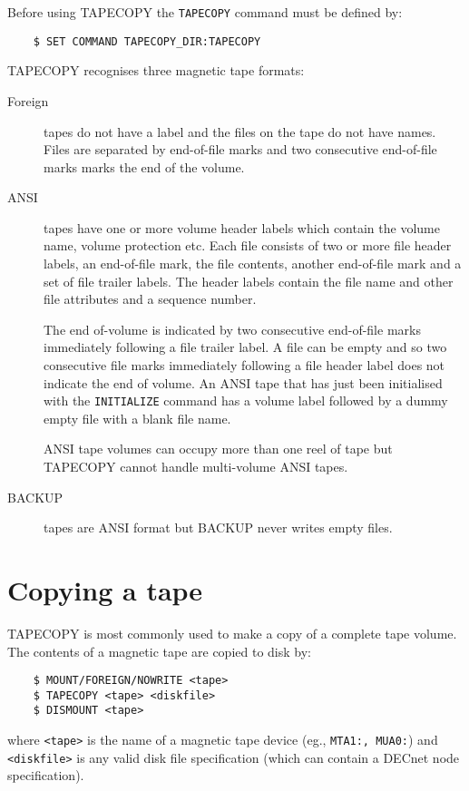 Before using TAPECOPY the {\tt TAPECOPY} command must be defined by:
\begin{verbatim}
    $ SET COMMAND TAPECOPY_DIR:TAPECOPY
\end{verbatim}

TAPECOPY recognises three magnetic tape formats:
\begin{description}
\item[Foreign] tapes do not have a label and the files on the tape do
not have names. Files are separated by end-of-file marks and two consecutive
end-of-file marks marks the end of the volume.

\item[ANSI] tapes have one or more volume header labels which contain  the
volume name, volume protection etc. Each file consists of two or more file
header labels, an end-of-file
mark, the file contents, another end-of-file mark and a set of file trailer
labels. The header labels contain the file name and other file attributes
and a sequence number.

The end of-volume is indicated by two consecutive end-of-file marks
immediately following a file trailer label. A file can be empty and so two
consecutive file marks immediately following a file header label does not
indicate the end of volume.
An ANSI tape that has just been initialised with the {\tt INITIALIZE} command
has a volume label followed by a dummy empty file with a blank file name.

ANSI tape volumes can occupy more than one reel of tape but TAPECOPY cannot
handle multi-volume ANSI tapes.

\item[BACKUP] tapes are ANSI format but BACKUP never writes empty files.
\end{description}


\section{Copying a tape}

TAPECOPY is most commonly used to make a copy of a complete tape volume.
The contents of a magnetic tape are copied to disk by:
\begin{verbatim}
    $ MOUNT/FOREIGN/NOWRITE <tape>
    $ TAPECOPY <tape> <diskfile>
    $ DISMOUNT <tape>
\end{verbatim}
where {\tt <tape>} is the name of a magnetic tape device (eg., {\tt MTA1:,
MUA0:}) and {\tt <diskfile>} is any valid disk file specification (which can
contain a DECnet node specification).

